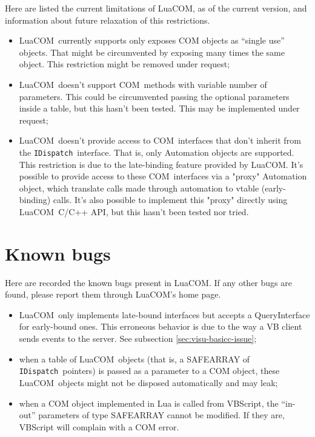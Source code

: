 \documentclass[11pt,a4paper,english]{report}
\newcommand{\ident}[1]{\mbox{\texttt{#1}}}
\newcommand{\techname}[1]{\mbox{#1}}
\newcommand{\com}{\techname{COM}}
\newcommand{\luacom}{\techname{LuaCOM}}
\newcommand{\idispatch}{\ident{IDispatch}}
\begin{document}
Here are listed the current limitations of \luacom, as of the current
version, and information about future relaxation of this restrictions.

\begin{itemize}

\item \luacom\ currently supports only exposes COM objects as ``single
use'' objects. That might be circumvented by exposing many times the
same object. This restriction might be removed under request;

\item \luacom\ doesn't support \com\ methods with variable number of
parameters. This could be circumvented passing the optional parameters
inside a table, but this hasn't been tested. This may be implemented
under request;

\item \luacom\ doesn't provide access to \com\ interfaces that don't
inherit from the \idispatch\ interface. That is, only Automation objects
are supported. This restriction is due to the late-binding feature
provided by \luacom. It's possible to provide access to these \com\
interfaces via a "proxy" Automation object, which translate calls made
through automation to vtable (early-binding) calls. It's also possible
to implement this "proxy" directly using \luacom\ C/C++ API, but this
hasn't been tested nor tried.

\end{itemize}


\section{Known bugs}
\label{sect:bugs}
Here are recorded the known bugs present in \luacom. If any other bugs
are found, please report them through \luacom's home page.

\begin{itemize}

\item \luacom\ only implements late-bound interfaces but accepts a
QueryInterface for early-bound ones. This erroneous behavior is due
to the way a VB client sends events to the server. See subsection
\ref{sec:visu-basicc-issue};

\item when a table of \luacom\ objects (that is, a SAFEARRAY of
\idispatch\ pointers) is passed as a parameter to a COM object, these
\luacom\ objects might not be disposed automatically and may leak;

\item when a COM object implemented in Lua is called from VBScript,
the ``in-out'' parameters of type SAFEARRAY cannot be modified. If
they are, VBScript will complain with a COM error.

\end{itemize}
\end{document}
